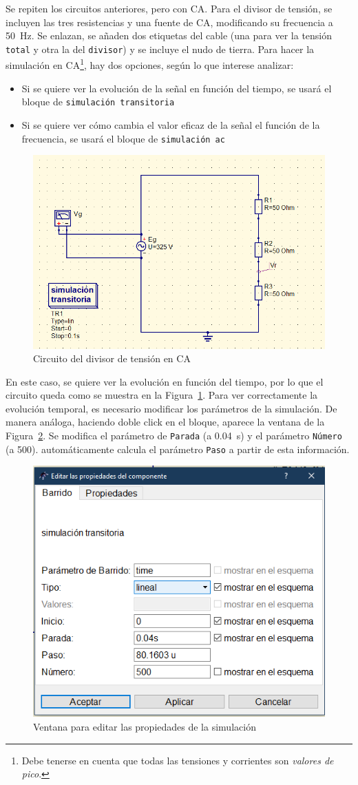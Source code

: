 \documentclass[a4paper,10pt]{article} %
\begin{document}
Se repiten los circuitos anteriores, pero con CA. Para el divisor de tensión, se incluyen las tres resistencias y una fuente de CA, modificando su frecuencia a \qty{50}{\hertz}. Se enlazan, se añaden dos etiquetas del cable (una para ver la tensión \texttt{total} y otra la del \texttt{divisor}) y se incluye el nudo de tierra. Para hacer la simulación en CA\footnote{Debe tenerse en cuenta que todas las tensiones y corrientes son \textit{valores de pico}.}, hay dos opciones, según lo que interese analizar: 
\begin{itemize}
    \item Si se quiere ver la evolución de la señal en función del tiempo, se usará el bloque de \texttt{simulación transitoria}
    \item Si se quiere ver cómo cambia el valor eficaz de la señal el función de la frecuencia, se usará el bloque de \texttt{simulación ac}
\end{itemize}
\begin{figure}[htbp]
    \centering
    \includegraphics[width=0.4\linewidth]{../figs/qucs_divisorTensionAC.png}
    \caption{Circuito del divisor de tensión en CA}
    \label{fig.qucs22}
\end{figure}
En este caso, se quiere ver la evolución en función del tiempo, por lo que el circuito queda como se muestra en la Figura~\ref{fig.qucs22}. Para ver correctamente la evolución temporal, es necesario modificar los parámetros de la simulación. De manera análoga, haciendo doble click en el bloque, aparece la ventana de la Figura~\ref{fig.qucs23}. Se modifica el parámetro de \texttt{Parada} (a \qty{0.04}{\second}) y el parámetro \texttt{Número} (a 500). {\qucs} automáticamente calcula el parámetro \texttt{Paso} a partir de esta información. 
\begin{figure}[h!]
    \centering
    \includegraphics[width=0.45\linewidth]{../figs/qucs_parametrosSimulacion.png}
    \caption{Ventana para editar las propiedades de la simulación}
    \label{fig.qucs23}
\end{figure}
\end{document}
